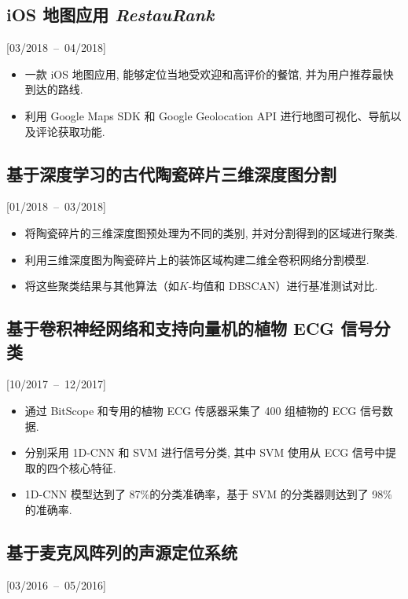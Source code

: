 \documentclass{mycv}
\begin{document}
\subsection{iOS 地图应用 \textit{RestauRank}}[03/2018~--~04/2018]

\begin{itemize}
  \itemsep 0em
  \item 一款 iOS 地图应用, 能够定位当地受欢迎和高评价的餐馆, 并为用户推荐最快到达的路线.
  \item 利用 Google Maps SDK 和 Google Geolocation API 进行地图可视化、导航以及评论获取功能.
\end{itemize}

\vspace{-0.5em}

\subsection{基于深度学习的古代陶瓷碎片三维深度图分割}[01/2018~--~03/2018]

\begin{itemize}
  \itemsep 0em
  \item 将陶瓷碎片的三维深度图预处理为不同的类别, 并对分割得到的区域进行聚类.
  \item 利用三维深度图为陶瓷碎片上的装饰区域构建二维全卷积网络分割模型.
  \item 将这些聚类结果与其他算法（如$K$-均值和 DBSCAN）进行基准测试对比.
\end{itemize}

\vspace{-0.5em}

\subsection{基于卷积神经网络和支持向量机的植物 ECG 信号分类}[10/2017~--~12/2017]

\begin{itemize}
  \item 通过 BitScope 和专用的植物 ECG 传感器采集了 400 组植物的 ECG 信号数据.
  \item 分别采用 1D-CNN 和 SVM 进行信号分类, 其中 SVM 使用从 ECG 信号中提取的四个核心特征.
  \item 1D-CNN 模型达到了 87\%的分类准确率，基于 SVM 的分类器则达到了 98\% 的准确率.
\end{itemize}

\vspace{-0.5em}

\subsection{基于麦克风阵列的声源定位系统}[03/2016~--~05/2016]
\end{document}
